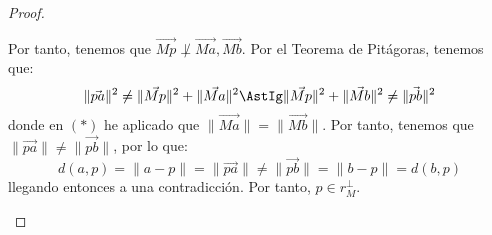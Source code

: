 \begin{proof}
\begin{description}
        Por tanto, tenemos que $\vec{Mp}\not \perp \vec{Ma},\vec{Mb}$. Por el Teorema de Pitágoras, tenemos que:
        \begin{equation*}
            \|\vec{pa}\|^2 \neq \|\vec{Mp}\|^2 + \|\vec{Ma}\|^2 \AstIg \|\vec{Mp}\|^2 + \|\vec{Mb}\|^2 \neq \|\vec{pb}\|^2
        \end{equation*}
        donde en $(\ast)$ he aplicado que $\|\vec{Ma}\|=\|\vec{Mb}\|$. Por tanto, tenemos que $\|\vec{pa}\|\neq\|\vec{pb}\|$, por lo que:
        \begin{equation*}
            d(a,p)=\|a-p\| = \|\vec{pa}\|\neq \|\vec{pb}\| = \|b-p\| = d(b,p)
        \end{equation*}
        llegando entonces a una contradicción. Por tanto, $p\in r_M^\perp$.
    \end{description}
\end{proof}


